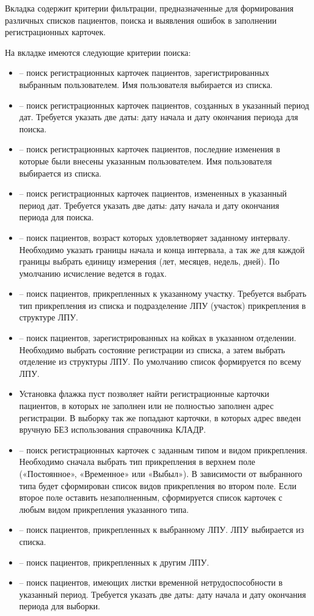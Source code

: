Вкладка  содержит критерии фильтрации, предназначенные для формирования различных списков пациентов, поиска и выявления ошибок в заполнении регистрационных карточек.

На вкладке имеются следующие критерии поиска:
\begin{itemize}
 \item {} – поиск регистрационных карточек пациентов, зарегистрированных выбранным пользователем. Имя пользователя выбирается из списка.
 \item	{} – поиск регистрационных карточек пациентов, созданных в указанный период дат. Требуется указать две даты: дату начала и дату окончания периода для поиска.
 \item	{} – поиск регистрационных карточек пациентов, последние изменения в которые были внесены указанным пользователем. Имя пользователя выбирается из списка.
 \item	{} – поиск регистрационных карточек пациентов, измененных в указанный период дат. Требуется указать две даты: дату начала и дату окончания периода для поиска.
 \item	{} – поиск пациентов, возраст которых удовлетворяет заданному интервалу. Необходимо указать границы начала и конца интервала, а так же для каждой границы выбрать единицу измерения (лет, месяцев, недель, дней). По умолчанию исчисление ведется в годах.
 \item {} – поиск пациентов, прикрепленных к указанному участку. Требуется выбрать тип прикрепления из списка и подразделение ЛПУ (участок) прикрепления в структуре ЛПУ.
 \item	{} – поиск пациентов, зарегистрированных на койках в указанном отделении. Необходимо выбрать состояние регистрации из списка, а затем выбрать отделение из структуры ЛПУ. По умолчанию список формируется по всему ЛПУ.
 \item	Установка флажка  пуст позволяет найти регистрационные карточки пациентов, в которых не заполнен или не полностью заполнен адрес регистрации. В выборку так же попадают карточки, в которых адрес введен вручную БЕЗ использования справочника КЛАДР.
 \item {} – поиск регистрационных карточек с заданным типом и видом прикрепления. Необходимо сначала выбрать тип прикрепления в верхнем поле («Постоянное», «Временное» или «Выбыл»). В зависимости от выбранного типа будет сформирован список видов прикрепления во втором поле. Если второе поле оставить незаполненным, сформируется список карточек с любым видом прикрепления указанного типа.
 \item	{} – поиск пациентов, прикрепленных к выбранному ЛПУ. ЛПУ выбирается из списка.
 \item {} – поиск пациентов, прикрепленных к другим ЛПУ.
 \item	{} – поиск пациентов, имеющих листки временной нетрудоспособности в указанный период. Требуется указать две даты: дату начала и дату окончания периода для выборки.
\end{itemize}

